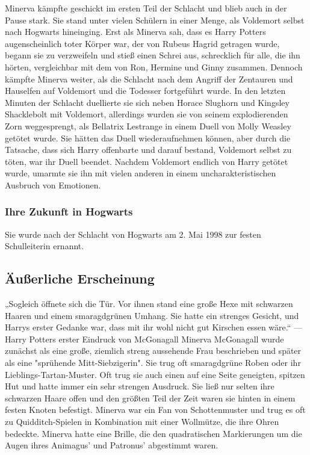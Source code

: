 \documentclass[a4paper, 10pt]{article}
\begin{document}
Minerva kämpfte geschickt im ersten Teil der Schlacht und blieb auch in der Pause stark. Sie stand unter vielen Schülern in einer Menge, als Voldemort selbst nach Hogwarts hineinging. Erst als Minerva sah, dass es Harry Potters augenscheinlich toter Körper war, der von Rubeus Hagrid getragen wurde, begann sie zu verzweifeln und stieß einen Schrei aus, schrecklich für alle, die ihn hörten, vergleichbar mit dem von Ron, Hermine und Ginny zusammen.
\vspace{10pt}
\newline
Dennoch kämpfte Minerva weiter, als die Schlacht nach dem Angriff der Zentauren und Hauselfen auf Voldemort und die Todesser fortgeführt wurde. In den letzten Minuten der Schlacht duellierte sie sich neben Horace Slughorn und Kingsley Shacklebolt mit Voldemort, allerdings wurden sie von seinem explodierenden Zorn weggesprengt, als Bellatrix Lestrange in einem Duell von Molly Weasley getötet wurde.
\vspace{10pt}
\newline
Sie hätten das Duell wiederaufnehmen können, aber durch die Tatsache, dass sich Harry offenbarte und darauf bestand, Voldemort selbst zu töten, war ihr Duell beendet. Nachdem Voldemort endlich von Harry getötet wurde, umarmte sie ihn mit vielen anderen in einem uncharakteristischen Ausbruch von Emotionen.
\subsubsection*{\large Ihre Zukunft in Hogwarts}
Sie wurde nach der Schlacht von Hogwarts am 2. Mai 1998 zur festen Schulleiterin ernannt.
\subsection*{\Large Äußerliche Erscheinung}
„Sogleich öffnete sich die Tür. Vor ihnen stand eine große Hexe mit schwarzen Haaren und einem smaragdgrünen Umhang. Sie hatte ein strenges Gesicht, und Harrys erster Gedanke war, dass mit ihr wohl nicht gut Kirschen essen wäre.“
\vspace{10pt}
\newline
— Harry Potters erster Eindruck von McGonagall
\vspace{10pt}
\newline
Minerva McGonagall wurde zunächst als eine große, ziemlich streng aussehende Frau beschrieben und später als eine "sprühende Mitt-Siebzigerin". Sie trug oft smaragdgrüne Roben oder ihr Lieblings-Tartan-Muster. Oft trug sie auch einen auf eine Seite geneigten, spitzen Hut und hatte immer ein sehr strengen Ausdruck. Sie ließ nur selten ihre schwarzen Haare offen und den größten Teil der Zeit waren sie hinten in einem festen Knoten befestigt.
\vspace{10pt}
\newline
Minerva war ein Fan von Schottenmuster und trug es oft zu Quidditch-Spielen in Kombination mit einer Wollmütze, die ihre 
Ohren bedeckte. Minerva hatte eine Brille, die den quadratischen Markierungen um die Augen ihres Animagus' und Patronus' abgestimmt waren.
\end{document}
